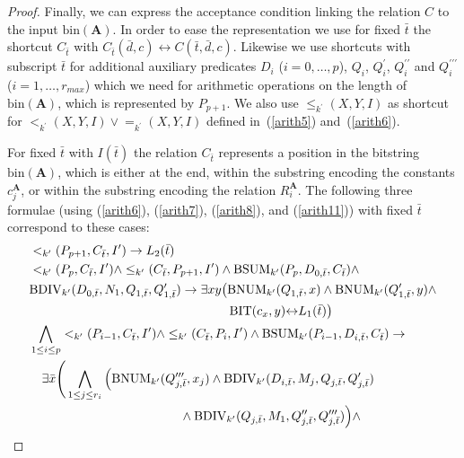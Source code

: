 \documentclass{article}
\begin{document}
\begin{proof}
Finally, we can express the acceptance condition linking the relation $C$ to the input $\mathrm{bin}(\textbf{A})$. In order to ease the representation we use for fixed $\bar{t}$ the shortcut $C_{\bar{t}}$ with $C_{\bar{t}}(\bar{d},c) \leftrightarrow C(\bar{t},\bar{d},c)$. Likewise we use shortcuts with subscript $\bar{t}$ for additional auxiliary predicates $D_i$ ($i=0,\dots,p$), $Q_i$, $Q_i^\prime$, $Q_i^{\prime\prime}$ and $Q_i^{\prime\prime\prime}$ ($i=1,\dots,r_{max}$) which we need for arithmetic operations on the length of $\mathrm{bin}(\textbf{A})$, which is represented by $P_{p+1}$. We also use $\le_{k^\prime}(X,Y,I)$ as shortcut for $<_{k^\prime}(X,Y,I) \vee =_{k^\prime}(X,Y,I)$ defined in~(\ref{arith5}) and~(\ref{arith6}).

For fixed $\bar{t}$ with $I(\bar{t})$ the relation $C_{\bar{t}}$ represents a position in the bitstring $\mathrm{bin}(\textbf{A})$, which is either at the end, within the substring encoding the constants $c_j^{\mathbf{A}}$, or within the substring encoding the relation $R_i^{\mathbf{A}}$. The following three formulae (using (\ref{arith6}), (\ref{arith7}), (\ref{arith8}), and (\ref{arith11})) with fixed $\bar{t}$ correspond to these cases:
\begin{align}
    & <_{k^\prime}(P_{p+1},C_{\bar{t}},I^\prime) \rightarrow L_2(\bar{t}) \notag \\
    & <_{k^\prime}(P_p,C_{\bar{t}},I^\prime) \wedge \le_{k^\prime}(C_{\bar{t}},P_{p+1},I^\prime) \wedge \mathrm{BSUM}_{k^\prime}(P_p,D_{0,\bar{t}},C_{\bar{t}}) \wedge \notag \\
      & \mathrm{BDIV}_{k^\prime}(D_{0,\bar{t}}, N_1, Q_{1,\bar{t}}, Q_{1,\bar{t}}^\prime)\to\exists xy \big( \mathrm{BNUM}_{k^\prime}(Q_{1,\bar{t}},x) \wedge \mathrm{BNUM}_{k^\prime}(Q_{1,\bar{t}}^\prime,y)
      \wedge \notag\\
      & \hspace*{5.6cm}\mathrm{BIT}(c_x,y) {\leftrightarrow} L_1(\bar{t})\big)
    \notag\\
& \bigwedge_{1 \le i \le p} <_{k^\prime}(P_{i-1},C_{\bar{t}},I^\prime) \wedge \le_{k^\prime}(C_{\bar{t}},P_i,I^\prime) \wedge \mathrm{BSUM}_{k^\prime}(P_{i-1},D_{i,\bar{t}},C_{\bar{t}}) \rightarrow \notag \\
    & \quad \exists \bar{x} \Bigg( \bigwedge_{1 \le j \le r_i} \Big( \mathrm{BNUM}_{k^\prime}(Q_{j,\bar{t}}^{\prime\prime\prime},x_j)
    \wedge \mathrm{BDIV}_{k^\prime}(D_{i,\bar{t}}, M_j, Q_{j,\bar{t}}, Q_{j,\bar{t}}^\prime)\notag\\
    & \quad \quad \quad\quad \quad \quad\quad \quad \quad\quad \quad \quad\wedge \mathrm{BDIV}_{k^\prime}(Q_{j,\bar{t}}, M_1, Q_{j,\bar{t}}^{\prime\prime}, Q_{j,\bar{t}}^{\prime\prime\prime}) \Big)\wedge

\end{align}
\end{proof}
\end{document}

